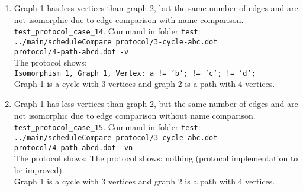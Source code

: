 \documentclass[12pt,a4paper]{report}
\begin{document}
\begin{enumerate}
{    compare: -1, key: par, value1: '', value2: '1'. \\
    compare: -1, key: par, value1: '', value2: '1'.} \\
    Graph 1 is a cycle with 3 vertices and graph 2 is a path with 4 vertices.
    Vertices in graph 2 have a parameter value 1. Vertices in graph 1 have no parameter.
  \item Graph 1 has less vertices than graph 2, but the same number of edges and are not isomorphic due to edge comparison with name comparison.
    \texttt{test\_protocol\_case\_14}. Command in folder \texttt{test}: \\
    \texttt{../main/scheduleCompare protocol/3-cycle-abc.dot \\ protocol/4-path-abcd.dot -v} \\
    The protocol shows: \\
    \texttt{Isomorphism 1, Graph 1, Vertex: a != 'b'; != 'c'; != 'd';} \\
    Graph 1 is a cycle with 3 vertices and graph 2 is a path with 4 vertices.
  \item Graph 1 has less vertices than graph 2, but the same number of edges and are not isomorphic due to edge comparison without name comparison.
    \texttt{test\_protocol\_case\_15}. Command in folder \texttt{test}: \\
    \texttt{../main/scheduleCompare protocol/3-cycle-abc.dot \\ protocol/4-path-abcd.dot -vn} \\
    The protocol shows: The protocol shows: nothing (protocol implementation to be improved).\\
    Graph 1 is a cycle with 3 vertices and graph 2 is a path with 4 vertices.


\end{enumerate}
\end{document}
